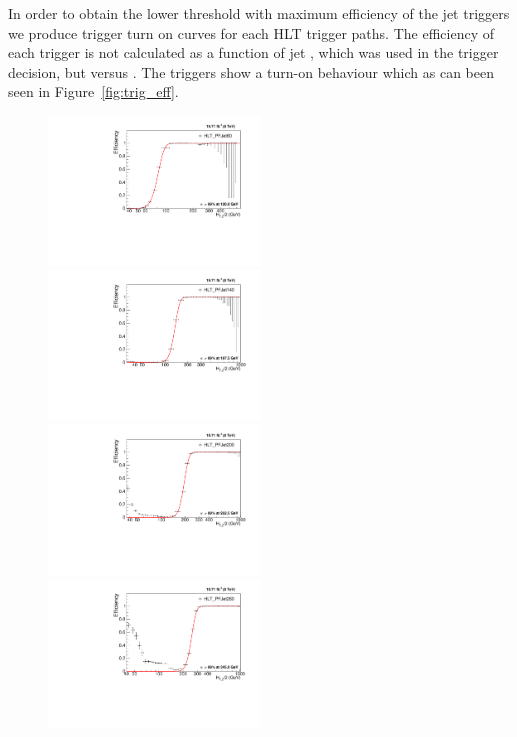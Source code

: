 In order to obtain the lower threshold with maximum efficiency of the jet triggers we produce trigger turn on curves for each HLT trigger 
paths. The efficiency of each trigger is not calculated as a function of jet \pt, which was used in the trigger decision, but versus 
\httwo. The triggers show a turn-on behaviour which as can been seen in Figure~\ref{fig:trig_eff}. 

\begin{figure}[!htbp]
  \begin{center}
    \includegraphics[width=0.5\textwidth]{Plots_HT_2_150/Fit_Turn_Efficiency_80_2_ht_2.pdf}%
    \includegraphics[width=0.5\textwidth]{Plots_HT_2_150/Fit_Turn_Efficiency_140_2_ht_2.pdf}\\
    \includegraphics[width=0.5\textwidth]{Plots_HT_2_150/Fit_Turn_Efficiency_200_2_ht_2.pdf}%
    \includegraphics[width=0.5\textwidth]{Plots_HT_2_150/Fit_Turn_Efficiency_260_2_ht_2.pdf}\\

\end{center}
\end{figure}
